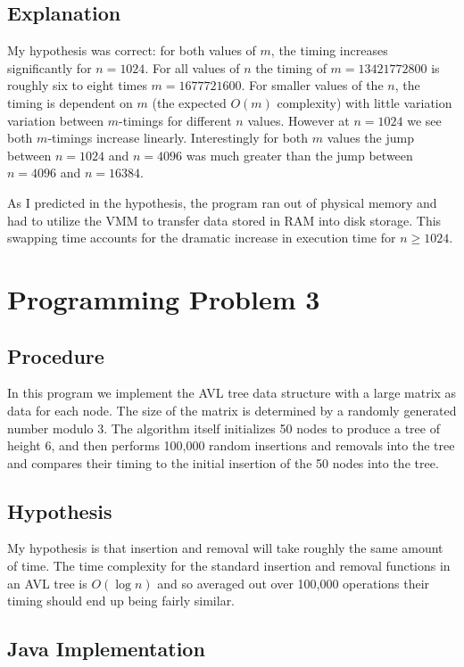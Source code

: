 \documentclass[11pt]{article}
\begin{document}
\subsection*{Explanation}

My hypothesis was correct: for both values of $m$, the timing increases significantly for $n=1024$. For all values of $n$ the timing of $m=13421772800$ is roughly six to eight times $m=1677721600$. For smaller values of the $n$, the timing is dependent on $m$ (the expected $O(m)$ complexity) with little variation variation between $m$-timings for different $n$ values. However at $n=1024$ we see both $m$-timings increase linearly. Interestingly for both $m$ values the jump between $n=1024$ and $n=4096$ was much greater than the jump between $n=4096$ and $n=16384$. 

As I predicted in the hypothesis, the program ran out of physical memory and had to utilize the VMM to transfer data stored in RAM into disk storage. This swapping time accounts for the dramatic increase in execution time for $n \geq 1024$.

\section*{Programming Problem 3}

\subsection*{Procedure}

In this program we implement the AVL tree data structure with a large matrix as data for each node. The size of the matrix is determined by a randomly generated number modulo 3. The algorithm itself initializes 50 nodes to produce a tree of height 6, and then performs 100,000 random insertions and removals into the tree and compares their timing to the initial insertion of the 50 nodes into the tree.

\subsection*{Hypothesis}

My hypothesis is that insertion and removal will take roughly the same amount of time. The time complexity for the standard insertion and removal functions in an AVL tree is $O(\log n)$ and so averaged out over 100,000 operations their timing should end up being fairly similar.

\subsection*{Java Implementation}
\end{document}
